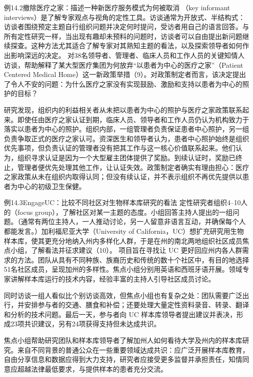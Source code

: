 \begin{bookbox}{例14.2\quad 撤除医疗之家：描述一种新医疗服务模式为何被取消}
（key informant interviews）是了解专家观点与视角的定性工具。访谈通常为开放式、半结构式：访谈者围绕预定主题自行组织问题并决定何时提问，受访者用自己的语言回答。与所有定性研究一样，当出现有趣却未预料的问题时，访谈者可以自由提出新问题继续探查。这种方法尤其适合了解专家对其熟知主题的看法，以及探索领导者如何作出影响深远的决定。
对38名领导者、管理者、临床人员和工作人员的关键知情人访谈，帮助解释了某大型医疗集团为何放弃“以患者为中心的医疗之家”（Patient Centered Medical Home）这一新政策举措（9）。对政策制定者而言，该决定提出了令人不安的问题：为什么医疗之家没有实现鼓励、激励和支持以患者为中心的照护的目标？

研究发现，组织内的利益相关者从未把以患者为中心的照护与医疗之家政策联系起来。即使任由医疗之家认证到期，临床人员、领导者和工作人员仍认为机构致力于落实以患者为中心的照护。组织内部，一组管理者负责保证患者中心照护，另一组负责争取正式的医疗之家认可。资深医生和领导者认为，患者中心照护始终是组织优先事项，但负责认证的管理者没有把其工作与这一核心价值联系起来。他们认为，组织寻求认证是因为一个大型雇主团体提供了奖励。到续认证时，奖励已终止，管理者便优先处理其他工作，让认证失效。政策制定者确实有理由担心：医疗之家政策从未在组织内取得认同；但没有续认证，并不表示组织不再优先提供以患者为中心的初级卫生保健。
\end{bookbox}

\begin{bookbox}{例14.3\quad EngageUC：比较不同社区对生物样本库研究的看法}
定性研究者组织4--10人的（focus group），了解社区对某一主题的态度。小组回答主持人提出的一组问题。（通常有两位主持人，一人推动讨论，另一人留意非语言互动，并确保每个人都能发言。）加利福尼亚大学（University of California，UC）想扩充研究用生物样本库，使其更充分地纳入州内多样化人群，于是在州的南北两地组织社区成员焦点小组，了解看法并征求建议（10）。
项目旨在寻找让 UC 更好回应州内各人群需求的方法。团队从具有不同种族、族裔历史和传统的数十个社区中，有目的地选择51名社区成员，呈现加州的多样性。焦点小组分别用英语和西班牙语开展。领域专家讲解样本库运行的技术内容，经验丰富的主持人引导社区成员讨论。

同时访谈一组人看似比个别访谈高效，但焦点小组也有复杂之处：团队需要广泛出行，并安排参与者的交通、膳食和补偿；还要处理大量定性资料录音、转录、翻译和分析的技术问题。最后一天，参与者向 UC 样本库领导者提出建议并表决，形成23项共识建议，另有24项获得支持但未达成共识。

焦点小组帮助研究团队和样本库领导者了解加州人如何看待大学及州内的样本库研究。来自不同背景的普通公众在一些重要领域达成共识：应广泛开展样本库教育，自由分享信息和数据应得到大力支持，研究者应接受更多监督并承担责任，知情同意应超越法律最低要求，与提供样本的患者充分交流。
\end{bookbox}

